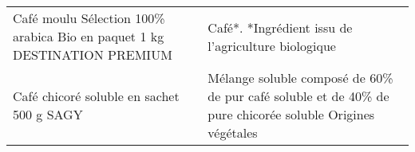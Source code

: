 \begin{longtable}{p{5cm}p{10cm}}
                                 Café moulu Sélection 100\% arabica Bio en paquet 1 kg DESTINATION PREMIUM &                                                                                                                                                                                                                                                                                                                                                                                                                                                                                                                                                                                                                                                                                                                                                                                                                                                                                                                                                                                      Café*. *Ingrédient issu de l'agriculture biologique \\
                                                                Café chicoré soluble en sachet 500 g SAGY &                                                                                                                                                                                                                                                                                                                                                                                                                                                                                                                                                                                                                                                                                                                                                                                                                                                                                                                                Mélange soluble composé de 60\% de pur café soluble et de 40\% de pure chicorée soluble  Origines végétales \\

\end{longtable}
